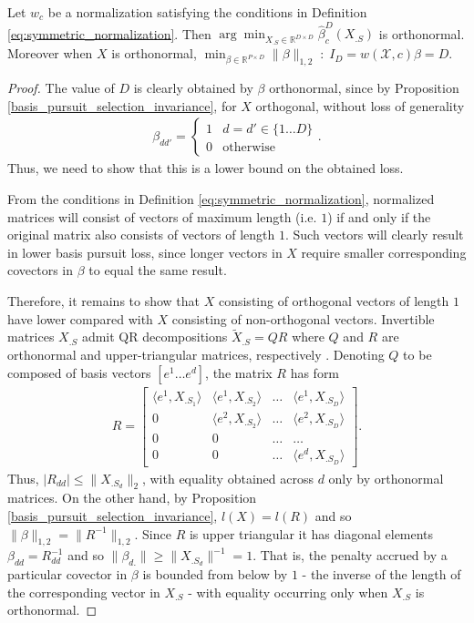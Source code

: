  \begin{proposition}
\label{prop:generalized_unitary_selection}
Let $w_c$ be a normalization satisfying the conditions in Definition \ref{eq:symmetric_normalization}.  Then $\arg \min_{X_{.S} \in \mathbb R^{D \times D}} \widehat \beta^{D}_c (X_{.S}) $ is orthonormal.  Moreover when $X$ is orthonormal, $\min_{\beta \in \mathbb R^{P \times D}} \| \beta \|_{1,2} \; : \; I_D = w ( \mathcal X, c) \beta = D$.
 \end{proposition}
 
 \begin{proof}

The value of $D$ is clearly obtained by $\beta$ orthonormal, since by Proposition \ref{basis_pursuit_selection_invariance}, for $X$ orthogonal, without loss of generality 
\begin{align}
\beta_{dd'} = \begin{cases} 1 & d = d' \in \{ 1 \dots D\}  \\
0 & \text{otherwise}
\end{cases}.
\end{align}
Thus, we need to show that this is a lower bound on the obtained loss.

From the conditions in Definition \ref{eq:symmetric_normalization}, normalized matrices will consist of vectors of maximum length (i.e. $1$) if and only if the original matrix also consists of vectors of length $1$.
Such vectors will clearly result in lower basis pursuit loss, since longer vectors in $X$ require smaller corresponding covectors in $\beta$ to equal the same result.

Therefore, it remains to show that $X$ consisting of orthogonal vectors of length $1$ have lower compared with $X$ consisting of non-orthogonal vectors.
Invertible matrices $X_{.S}$ admit QR decompositions $\tilde X_{.S} = QR$ where $Q$ and $R$ are orthonormal and upper-triangular matrices, respectively \citep{Anderson1992-fb}.
Denoting $Q$ to be composed of basis vectors $[e^1 \dots e^d]$, the matrix $R$ has form
\begin{align}
R = \begin{bmatrix}
\langle e^1, X_{.S_1} \rangle & \langle e^1,  X_{.S_2} \rangle  &\dots &  \langle e^1,  X_{.S_D} \rangle \\
0 & \langle e^2,  X_{.S_2} \rangle & \dots  &  \langle e^2,  X_{.S_D} \rangle\\
0 & 0 & \dots & \dots  \\
0 & 0 & \dots & \langle e^d, X_{.S_D} \rangle 
\end{bmatrix}.
\end{align}
Thus, $|R_{dd} | \leq \|X_{.{S_{d}}}\|_2$, with equality obtained across $d$ only by orthonormal matrices.
On the other hand, by Proposition \ref{basis_pursuit_selection_invariance}, $l(X) = l(R)$ and so $\|\beta\|_{1,2} = \|R^{-1}\|_{1,2}$.
Since $R$ is upper triangular it has diagonal elements $\beta_{dd} = R_{dd}^{-1}$ and so $\|\beta_{d.}\| \geq \| X_{.{S_d}}\|^{-1} = 1$.
That is, the penalty accrued by a particular covector in $\beta$ is bounded from below by $1$ - the inverse of the length of the corresponding vector in $X_{.S}$ - with equality occurring only when $X_{.S}$ is orthonormal.


\end{proof}
